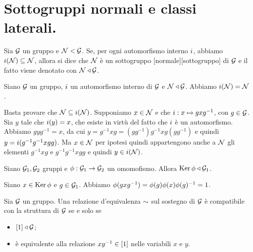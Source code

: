 \section{Sottogruppi normali e classi laterali.}\label{SottogruppiNormaliEQuozienti}
\begin{Definition}
	Sia $\mathcal{G}$ un gruppo e $\mathcal{N} < \mathcal{G}$. Se, per ogni automorfismo interno $\InnerAutomorphism$, abbiamo $\InnerAutomorphism(\NormalSubgroup) \subseteq \NormalSubgroup$, allora si dice che $\mathcal{N}$ \`e un sottogruppo [normale][sottogruppo] di $\mathcal{G}$ e il fatto viene denotato con $\mathcal{N} \triangleleft \mathcal{G}$.
\end{Definition}
\begin{Theorem}
	Siano $\mathcal{G}$ un gruppo, $\InnerAutomorphism$ un automorfismo interno di $\mathcal{G}$ e $\mathcal{N} \triangleleft \mathcal{G}$. Abbiamo $\InnerAutomorphism(\NormalSubgroup) = \NormalSubgroup$.
\end{Theorem}
\Proof Basta provare che $\NormalSubgroup \subseteq \InnerAutomorphism(\NormalSubgroup)$. Supponiamo $x \in \mathcal{N}$ e che $\InnerAutomorphism: x \mapsto gxg^{-1}$, con $g \in \mathcal{G}$. Sia $y$ tale che $\InnerAutomorphism(y) = x$, che esiste in virt\`u del fatto che $\InnerAutomorphism$ \`e un automorfismo. Abbiamo $gyg^{-1} = x$, da cui $y = g^{-1}xg = (gg^{-1})g^{-1}xg(gg^{-1})$ e quindi $y = \InnerAutomorphism(g^{-1}g^{-1}xgg)$. Ma $x \in \mathcal{N}$ per ipotesi quindi appartengono anche a $\mathcal{N}$ gli elementi $g^{-1}xg$ e $g^{-1}g^{-1}xgg$ e quindi $y \in \InnerAutomorphism(\NormalSubgroup)$. \EndProof
\begin{Theorem}
	Siano $\mathcal{G}_1, \mathcal{G}_2$ gruppi e $\phi: \mathcal{G}_1 \rightarrow \mathcal{G}_2$ un omomofismo. Allora $\operatorname{Ker}{\phi} \triangleleft \mathcal{G}_1$.
\end{Theorem}
\Proof Siano $x \in \operatorname{Ker}{\phi}$ e $g \in \mathcal{G}_1$. Abbiamo $\phi(gxg^{-1}) = \phi(g)\phi(x)\phi(g)^{-1} = 1$. \EndProof
\begin{Theorem}
	Sia $\mathcal{G}$ un gruppo. Una relazione d'equivalenza $\Equivalence$ sul sostegno di $\mathcal{G}$ \`e compatibile con la struttura di $\mathcal{G}$ se e solo se
	\begin{itemize}
		\item $\EquivalenceClass{1} \IsNormalSubgroup \Group$;
		\item \`e equivalente alla relazione $xy^{-1} \in \EquivalenceClass{1}$ nelle variabili $x$ e $y$.
	\end{itemize}
\end{Theorem}
